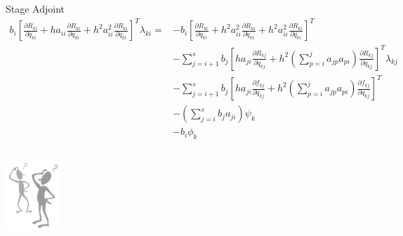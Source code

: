 \documentclass{beamer}
\newcommand{\pd}[2]{\frac{\partial #1}{\partial #2}}
\begin{document}
\begin{frame}[allowframebreaks]
  \scriptsize{
    \begin{block}{Stage Adjoint}
      \begin{equation}\nonumber
        \begin{split}
          b_i \left[ \pd{R_{ki}}{\ddot{q}_{ki}} + ha_{ii} \pd{R_{ki}}{\dot{q}_{ki}} + h^2 a_{ii}^2 \pd{R_{ki}}{{q}_{ki}} \right]^T \lambda_{ki} = & - b_i \left[ \pd{R_{ki}}{\ddot{q}_{ki}} + h^2a_{ii}^2 \pd{R_{ki}}{\dot{q}_{ki}} + h^2a_{ii}^2 \pd{R_{ki}}{{q}_{ki}} \right]^T \\
          & - \sum_{j=i+1}^s b_j \left[ ha_{ji} \pd{R_{kj}}{\dot{q}_{kj}} 
            + h^2 (\sum_{p=i}^j a_{jp}a_{pi}) 
            \pd{R_{kj}}{{q}_{kj}} \right]^T \lambda_{kj} \\
          & -  \sum_{j=i+1}^s b_j \left[ ha_{ji} \pd{f_{kj}}{\dot{q}_{kj}} 
            + h^2 (\sum_{p=i}^j a_{jp}a_{pi}) 
            \pd{f_{kj}}{{q}_{kj}} \right]^T  \\
          & -   (\sum_{j=i}^s b_j a_{ji}) \psi_{k}  \\
          &  - b_i \phi_{k} 
        \end{split}
      \end{equation}
    \end{block}
  }
\end{frame}

\begin{frame}
  \begin{columns}
    \column{6cm}
    \begin{block}{}
      \centerline{ 
        \includegraphics[width=0.5\textwidth]{Question.png} 
      }
    \end{block}
  \end{columns}
\end{frame}
\end{document}
